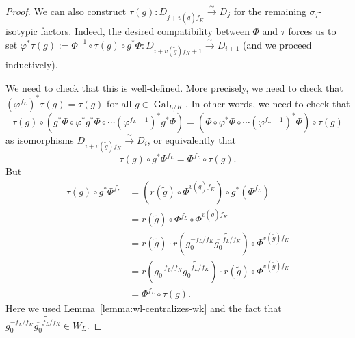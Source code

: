 \documentclass{amsart}
\theoremstyle{definition}
\theoremstyle{remark}
\newcommand{\mar}[1]{}
\newcommand{\mar}[1]{\marginpar{\raggedright\tiny squirrel #1}}
\DeclareMathOperator{\Gal}{Gal}
\begin{document}
\begin{proof}
We can also construct $\tau(g):D_{j+ v(\widetilde
  g)f_K}\xrightarrow{\sim} D_j$ for the remaining $\sigma_j$-isotypic
factors.  Indeed, the desired compatibility between $\Phi$ and $\tau$
forces us to set $\varphi^\ast\tau(g):=\Phi^{-1}\circ \tau(g)\circ
{g}^\ast\Phi:D_{i+ v(\widetilde g)f_K+ 1}\xrightarrow\sim D_{i+ 1}$
(and we proceed inductively). %

We need to check that this is well-defined.  More precisely, we need to check that $(\varphi^{f_L})^\ast\tau(g)=\tau(g)$ for all $g\in\Gal_{L/K}$.  In other words, we need to check that
\[	\tau(g)\circ\left({g}^\ast\Phi\circ \varphi^\ast{g}^\ast\Phi\circ\cdots(\varphi^{f_L-1})^\ast{g}^\ast\Phi\right)=\left(\Phi\circ \varphi^\ast\Phi\circ\cdots(\varphi^{f_L-1})^\ast\Phi\right)\circ\tau(g)	\]
as isomorphisms $D_{i+v(\widetilde g)f_K}\xrightarrow\sim D_i$, or equivalently that
\[	\tau(g)\circ g^\ast\Phi^{f_L}=\Phi^{f_L}\circ\tau(g).	\]
But
\begin{align*}
\tau(g)\circ g^\ast\Phi^{f_L}&=\left(r(\widetilde g)\circ\Phi^{v(\widetilde g)f_K}\right)\circ g^\ast(\Phi^{f_L})	\\
&= r(\widetilde g)\circ\Phi^{f_L}\circ \Phi^{v(\widetilde g)f_K}	\\
&=r(\widetilde g)\cdot r(g_0^{-f_L/f_K}\widetilde{\overline{g_0}^{f_L/f_K}})\circ \Phi^{v(\widetilde g)f_K}	\\
&=r(g_0^{-f_L/f_K}\widetilde{\overline{g_0}^{f_L/f_K}})\cdot r(\widetilde g)\circ \Phi^{v(\widetilde g)f_K}	\\
&=\Phi^{f_L}\circ \tau(g).
\end{align*}
Here we used Lemma~\ref{lemma:wl-centralizes-wk} and the fact that $g_0^{-f_L/f_K}\widetilde{\overline{g_0}^{f_L/f_K}}\in W_L$.


\end{proof}
\end{document}
